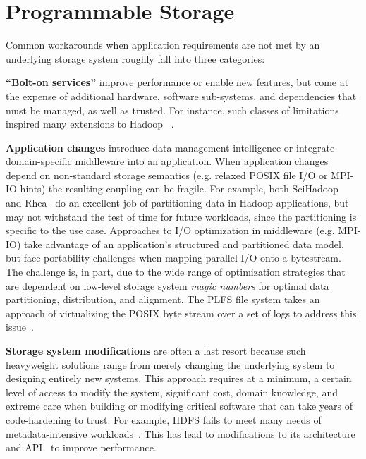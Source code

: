 \section{Programmable Storage}
\label{sec:progly}

Common workarounds when application requirements are not met
by an underlying storage system roughly fall into three categories:

{\bf ``Bolt-on services''} improve performance
or enable new features, but come at the expense of additional hardware, software
sub-systems, and dependencies that must be managed, as well as trusted.
For instance, such classes of limitations inspired many extensions to Hadoop
~\cite{bu:vldb2010-haloop, ekanayake:hpdc2010-twister,
ekanayake:escience2008-eglmapreduce, mihailescu:hotstorage2012-mixapart}.

{\bf Application changes} introduce data management intelligence or integrate
domain-specific middleware into an application.  When application changes
depend on non-standard storage semantics (e.g. relaxed POSIX file I/O or
MPI-IO hints) the resulting coupling can be fragile.  For example, both
SciHadoop~\cite{buck:hpc2011-scihadoop} and
Rhea~\cite{gkantsidis:nsdi2013-rhea} do an excellent job of partitioning data
in Hadoop applications, but may not withstand the test of time for future
workloads, since the partitioning is specific to the use case. Approaches to
I/O optimization in middleware (e.g.  MPI-IO) take advantage of an
application's structured and partitioned data model, but face portability
challenges when mapping parallel I/O onto a bytestream. The challenge is, in
part, due to the wide range of optimization strategies that are dependent on
low-level storage system \emph{magic numbers} for optimal data partitioning,
distribution, and alignment. The PLFS file system takes an approach of
virtualizing the POSIX byte stream over a set of logs to address this
issue~\cite{plfs}.

{\bf Storage system modifications} are often a last resort because such
heavyweight solutions range from merely changing the underlying system to
designing entirely new systems. This approach requires at a minimum, a certain level of
access to modify the system, significant cost, domain knowledge, and extreme care when building or
modifying critical software that can take years of code-hardening to trust.
For example, HDFS fails to meet many needs of metadata-intensive
workloads~\cite{shvachko:login2012-hdfs-scalability}.  This has lead to
modifications to its architecture and API~\cite{balmin:sigmod2012-clydesdale}
to improve performance.

